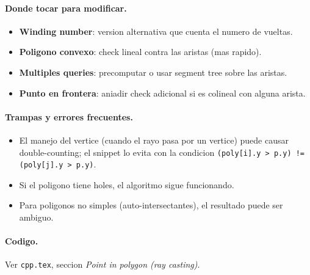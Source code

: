 \paragraph{Donde tocar para modificar.}
\begin{itemize}\setlength\itemsep{0pt}
	\item \textbf{Winding number}: version alternativa que cuenta el numero de vueltas.
	\item \textbf{Poligono convexo}: check lineal contra las aristas (mas rapido).
	\item \textbf{Multiples queries}: precomputar o usar segment tree sobre las aristas.
	\item \textbf{Punto en frontera}: aniadir check adicional si es colineal con alguna arista.
\end{itemize}

\paragraph{Trampas y errores frecuentes.}
\begin{itemize}\setlength\itemsep{0pt}
	\item El manejo del vertice (cuando el rayo pasa por un vertice) puede causar double-counting; el snippet lo evita con la condicion \texttt{(poly[i].y > p.y) != (poly[j].y > p.y)}.
	\item Si el poligono tiene holes, el algoritmo sigue funcionando.
	\item Para poligonos no simples (auto-intersectantes), el resultado puede ser ambiguo.
\end{itemize}

\paragraph{Codigo.}
Ver \texttt{cpp.tex}, seccion \textit{Point in polygon (ray casting)}.

\vspace{0.5em}

